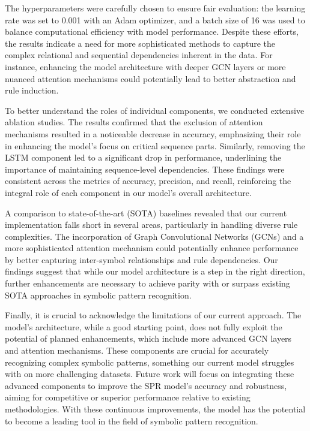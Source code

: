 \documentclass{article}
\begin{document}
The hyperparameters were carefully chosen to ensure fair evaluation: the learning rate was set to 0.001 with an Adam optimizer, and a batch size of 16 was used to balance computational efficiency with model performance. Despite these efforts, the results indicate a need for more sophisticated methods to capture the complex relational and sequential dependencies inherent in the data. For instance, enhancing the model architecture with deeper GCN layers or more nuanced attention mechanisms could potentially lead to better abstraction and rule induction.

To better understand the roles of individual components, we conducted extensive ablation studies. The results confirmed that the exclusion of attention mechanisms resulted in a noticeable decrease in accuracy, emphasizing their role in enhancing the model's focus on critical sequence parts. Similarly, removing the LSTM component led to a significant drop in performance, underlining the importance of maintaining sequence-level dependencies. These findings were consistent across the metrics of accuracy, precision, and recall, reinforcing the integral role of each component in our model's overall architecture.

A comparison to state-of-the-art (SOTA) baselines revealed that our current implementation falls short in several areas, particularly in handling diverse rule complexities. The incorporation of Graph Convolutional Networks (GCNs) and a more sophisticated attention mechanism could potentially enhance performance by better capturing inter-symbol relationships and rule dependencies. Our findings suggest that while our model architecture is a step in the right direction, further enhancements are necessary to achieve parity with or surpass existing SOTA approaches in symbolic pattern recognition.

Finally, it is crucial to acknowledge the limitations of our current approach. The model's architecture, while a good starting point, does not fully exploit the potential of planned enhancements, which include more advanced GCN layers and attention mechanisms. These components are crucial for accurately recognizing complex symbolic patterns, something our current model struggles with on more challenging datasets. Future work will focus on integrating these advanced components to improve the SPR model's accuracy and robustness, aiming for competitive or superior performance relative to existing methodologies. With these continuous improvements, the model has the potential to become a leading tool in the field of symbolic pattern recognition.
\end{document}
